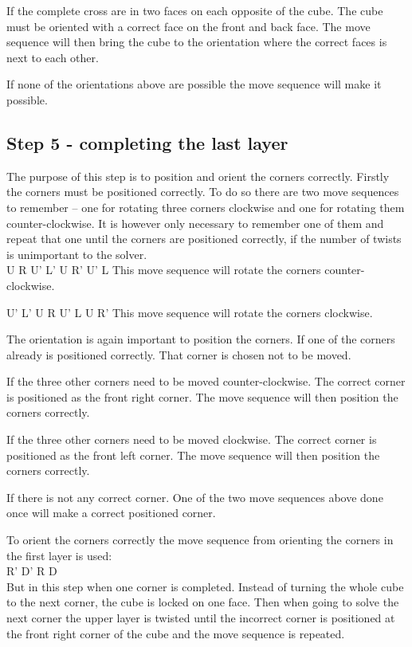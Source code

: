 If the complete cross are in two faces on each opposite of the cube. The cube must be oriented with a correct face on the front and back face. The move sequence will then bring the cube to the orientation where the correct faces is next to each other.

If none of the orientations above are possible the move sequence will make it possible.

\subsection{Step 5 - completing the last layer}
The purpose of this step is to position and orient the corners correctly. Firstly the corners must be positioned correctly. To do so there are two move sequences to remember -- one for rotating three corners clockwise and one for rotating them counter-clockwise. It is however only necessary to remember one of them and repeat that one until the corners are positioned correctly, if the number of twists is unimportant to the solver. \\

U R U' L' U R' U' L
This move sequence will rotate the corners counter-clockwise.

U' L' U R U' L U R'
This move sequence will rotate the corners clockwise.

The orientation is again important to position the corners. If one of the corners already is positioned correctly. That corner is chosen not to be moved. 

If the three other corners need to be moved counter-clockwise. The correct corner is positioned as the front right corner. The move sequence will then position the corners correctly.

If the three other corners need to be moved clockwise. The correct corner is positioned as the front left corner. The move sequence will then position the corners correctly.

If there is not any correct corner. One of the two move sequences above done once will make a correct positioned corner.

To orient the corners correctly the move sequence from orienting the corners in the first layer is used: \\

R' D' R D \\

But in this step when one corner is completed. Instead of turning the whole cube to the next corner, the cube is locked on one face. Then when going to solve the next corner the upper layer is twisted until the incorrect corner is positioned at the front right corner of the cube and the move sequence is repeated.